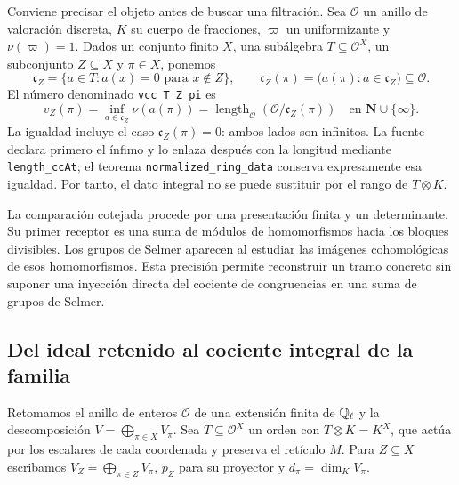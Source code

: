 Conviene precisar el objeto antes de buscar una filtración. Sea $\mathcal O$ un anillo de valoración discreta, $K$ su cuerpo de fracciones, $\varpi$ un uniformizante y $\nu(\varpi)=1$. Dados un conjunto finito $X$, una subálgebra $T\subseteq\mathcal O^X$, un subconjunto $Z\subseteq X$ y $\pi\in X$, ponemos
\begin{equation}
 \mathfrak c_Z=\{a\in T:a(x)=0\text{ para }x\notin Z\},\qquad
 \mathfrak c_Z(\pi)=\bigl(a(\pi):a\in\mathfrak c_Z\bigr)\subseteq\mathcal O.
 \label{eq:ct25-ideal-real}
\end{equation}
El número denominado \texttt{vcc T Z pi} es
\[
 v_Z(\pi)=\inf_{a\in\mathfrak c_Z}\nu(a(\pi))
          =\operatorname{length}_{\mathcal O}(\mathcal O/\mathfrak c_Z(\pi))
          \quad\text{en }\mathbf N\cup\{\infty\}.
\]
La igualdad incluye el caso $\mathfrak c_Z(\pi)=0$: ambos lados son infinitos. La fuente declara primero el ínfimo y lo enlaza después con la longitud mediante \texttt{length\_ccAt}; el teorema \texttt{normalized\_ring\_data} conserva expresamente esa igualdad. Por tanto, el dato integral no se puede sustituir por el rango de $T\otimes K$.

La comparación cotejada procede por una presentación finita y un determinante. Su primer receptor es una suma de módulos de homomorfismos hacia los bloques divisibles. Los grupos de Selmer aparecen al estudiar las imágenes cohomológicas de esos homomorfismos. Esta precisión permite reconstruir un tramo concreto sin suponer una inyección directa del cociente de congruencias en una suma de grupos de Selmer.

\subsection{Del ideal retenido al cociente integral de la familia}

Retomamos el anillo de enteros $\mathcal O$ de una extensión finita
de $\mathbb{Q}_\ell$ y la descomposición $V=\bigoplus_{\pi\in X}V_\pi$.
Sea $T\subseteq\mathcal O^X$ un orden con
$T\otimes K=K^X$, que actúa por los escalares de cada coordenada
y preserva el retículo $M$. Para $Z\subseteq X$ escribamos
$V_Z=\bigoplus_{\pi\in Z}V_\pi$, $p_Z$ para su proyector y
$d_\pi=\dim_KV_\pi$.

